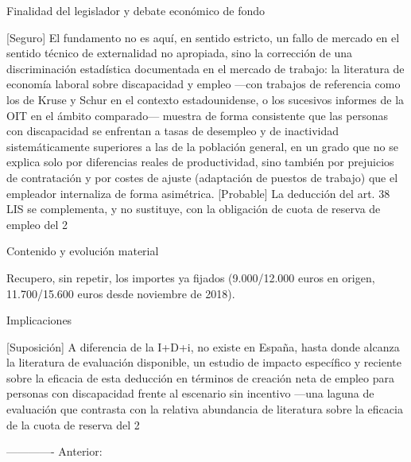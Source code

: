 \documentclass[10pt,a4paper]{article}
\begin{document}
Finalidad del legislador y debate económico de fondo

[Seguro] El fundamento no es aquí, en sentido estricto, un fallo de mercado en el sentido técnico de externalidad no apropiada, sino la corrección de una discriminación estadística documentada en el mercado de trabajo: la literatura de economía laboral sobre discapacidad y empleo —con trabajos de referencia como los de Kruse y Schur en el contexto estadounidense, o los sucesivos informes de la OIT en el ámbito comparado— muestra de forma consistente que las personas con discapacidad se enfrentan a tasas de desempleo y de inactividad sistemáticamente superiores a las de la población general, en un grado que no se explica solo por diferencias reales de productividad, sino también por prejuicios de contratación y por costes de ajuste (adaptación de puestos de trabajo) que el empleador internaliza de forma asimétrica. [Probable] La deducción del art. 38 LIS se complementa, y no sustituye, con la obligación de cuota de reserva de empleo del 2%

Contenido y evolución material

Recupero, sin repetir, los importes ya fijados (9.000/12.000 euros en origen, 11.700/15.600 euros desde noviembre de 2018).

Implicaciones

[Suposición] A diferencia de la I+D+i, no existe en España, hasta donde alcanza la literatura de evaluación disponible, un estudio de impacto específico y reciente sobre la eficacia de esta deducción en términos de creación neta de empleo para personas con discapacidad frente al escenario sin incentivo —una laguna de evaluación que contrasta con la relativa abundancia de literatura sobre la eficacia de la cuota de reserva del 2%

------------- Anterior:
\end{document}
